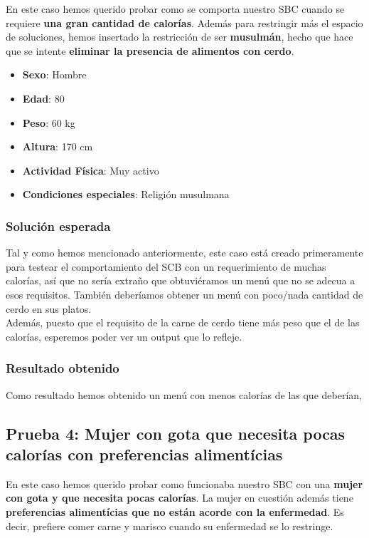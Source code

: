 \documentclass[11]{article}
\begin{document}
En este caso hemos querido probar como se comporta nuestro SBC cuando se requiere \textbf{una gran cantidad de calorías}. Además para restringir más el espacio de soluciones, hemos insertado la restricción de ser \textbf{musulmán}, hecho que hace que se intente \textbf{eliminar la presencia de alimentos con cerdo}. 

\begin{itemize}
\item \textbf{Sexo}: Hombre
\item \textbf{Edad}: 80
\item \textbf{Peso}: 60 kg
\item \textbf{Altura}: 170 cm
\item \textbf{Actividad Física}: Muy activo
\item \textbf{Condiciones especiales}: Religión musulmana
\end{itemize}

\subsubsection{Solución esperada}
Tal y como hemos mencionado anteriormente, este caso está creado primeramente para testear el comportamiento del SCB con un requerimiento de muchas calorías, así que no sería extraño que obtuviéramos un menú que no se adecua a esos requisitos. También deberíamos obtener un menú con poco/nada cantidad de cerdo en sus platos. 
\\
Además, puesto que el requisito de la carne de cerdo tiene más peso que el de las calorías, esperemos poder ver un output que lo refleje. 

\subsubsection{Resultado obtenido}

Como resultado hemos obtenido un menú con menos calorías de las que deberían, 

\subsection{Prueba 4: Mujer con gota que necesita pocas calorías con preferencias alimentícias}

En este caso hemos querido probar como funcionaba nuestro SBC con una \textbf{mujer con gota y que necesita pocas calorías}. La mujer en cuestión además tiene \textbf{preferencias alimentícias que no están acorde con la enfermedad}. Es decir, prefiere comer carne y marisco cuando su enfermedad se lo restringe. 
\end{document}
